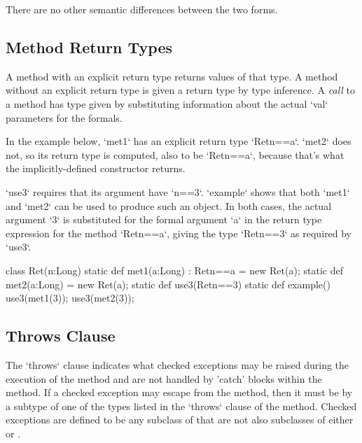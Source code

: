 There are no other semantic differences between the two forms. 

\subsection{Method Return Types}

A method with an explicit return type returns values of that type.
A method without an
explicit return type is given a return type by type inference.
A {\em call} to a method has type given by substituting information about the
actual \xcd`val` parameters for the formals.

\begin{ex}

In the example below, \xcd`met1` has an explicit return type \xcd`Ret{n==a}`.
\xcd`met2` does not, so its return type is computed, also to be
\xcd`Ret{n==a}`, because that's what the implicitly-defined constructor 
returns.

\xcd`use3` requires that its argument have \xcd`n==3`.  
\xcd`example` shows that both \xcd`met1` and \xcd`met2` can be used to produce
such an object.  In both cases, the actual argument \xcd`3` is substituted for
the formal argument \xcd`a` in the return type expression for the method
\xcd`Ret{n==a}`, giving the type \xcd`Ret{n==3}` as required by \xcd`use3`.

\begin{xten}
class Ret(n:Long) {
  static def met1(a:Long) : Ret{n==a} = new Ret(a);
  static def met2(a:Long)             = new Ret(a);
  static def use3(Ret{n==3}) {}
  static def example() {
     use3(met1(3));
     use3(met2(3));
  }  
}
\end{xten}
%


\end{ex}


\subsection{Throws Clause}
The \xcd`throws` clause indicates what checked exceptions may be
raised during the execution of the method and are not handled by
\xcd'catch' blocks within the method.  If a checked exception may
escape from the method, then it must be by a subtype of one of the
types listed in the \xcd`throws` clause of the method.   Checked
exceptions are defined to be any subclass of
 that are not also subclasses of
either  or . 

